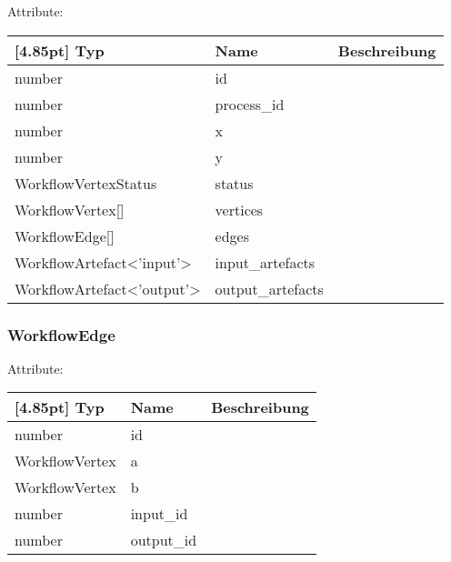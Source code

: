     		Attribute:
                \begin{center}
                	\renewcommand{\arraystretch}{1.5}
    	            \setlength\tabcolsep{5pt}
                	\begin{tabularx}{\textwidth}{|l|l|X|}
                		\hline
                        \rowcolor[gray]{0.75}[4.85pt]
                	    Typ & Name & Beschreibung \\ \hline
                		number & id &  \\ \hline
                		number & process_id &  \\ \hline
                		number & x &  \\ \hline
                		number & y &  \\ \hline
                		WorkflowVertexStatus & status &  \\ \hline
                		WorkflowVertex[] & vertices &  \\ \hline
                		WorkflowEdge[] & edges &  \\ \hline
                		WorkflowArtefact<'input'> & input_artefacts &  \\ \hline
                		WorkflowArtefact<'output'> & output_artefacts &  \\ \hline
                	\end{tabularx}
                \end{center}
                
    		\subsubsection{WorkflowEdge}
    		
    		Attribute:
                \begin{center}
                	\renewcommand{\arraystretch}{1.5}
    	            \setlength\tabcolsep{5pt}
                	\begin{tabularx}{\textwidth}{|l|l|X|}
                		\hline
                        \rowcolor[gray]{0.75}[4.85pt]
                	    Typ & Name & Beschreibung \\ \hline
                		number & id &  \\ \hline
                		WorkflowVertex & a &  \\ \hline
                		WorkflowVertex & b &  \\ \hline
                		number & input_id &  \\ \hline
                		number & output_id &  \\ \hline
                	\end{tabularx}
                \end{center}
                
